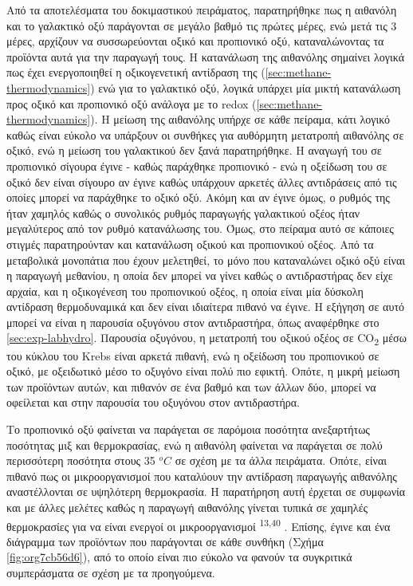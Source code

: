 \documentclass[11pt]{report}
\makeatletter
\newcommand{\citeprocitem}[2]{\hyper@linkstart{cite}{citeproc_bib_item_#1}#2\hyper@linkend}
\makeatother
\begin{document}
Από τα αποτελέσματα του δοκιμαστικού πειράματος, παρατηρήθηκε πως η αιθανόλη και το γαλακτικό οξύ παράγονται σε μεγάλο βαθμό τις πρώτες μέρες, ενώ μετά τις 3 μέρες, αρχίζουν να συσσωρεύονται οξικό και προπιονικό οξύ, καταναλώνοντας τα προϊόντα αυτά για την παραγωγή τους. Η κατανάλωση της αιθανόλης σημαίνει λογικά πως έχει ενεργοποιηθεί η οξικογενετική αντίδραση της (\autoref{sec:methane-thermodynamics}) ενώ για το γαλακτικό οξύ, λογικά υπάρχει μία μικτή κατανάλωση προς οξικό και προπιονικό οξύ ανάλογα με το \acrshort{redox} (\autoref{sec:methane-thermodynamics}). Η μείωση της αιθανόλης υπήρχε σε κάθε πείραμα, κάτι λογικό καθώς είναι εύκολο να υπάρξουν οι συνθήκες για αυθόρμητη μετατροπή αιθανόλης σε οξικό, ενώ η μείωση του γαλακτικού δεν ξανά παρατηρήθηκε. Η αναγωγή του σε προπιονικό σίγουρα έγινε - καθώς παράχθηκε προπιονικό - ενώ η οξείδωση του σε οξικό δεν είναι σίγουρο αν έγινε καθώς υπάρχουν αρκετές άλλες αντιδράσεις από τις οποίες μπορεί να παράχθηκε το οξικό οξύ. Ακόμη και αν έγινε όμως, ο ρυθμός της ήταν χαμηλός καθώς ο συνολικός ρυθμός παραγωγής γαλακτικού οξέος ήταν μεγαλύτερος από τον ρυθμό κατανάλωσης του. Όμως, στο πείραμα αυτό σε κάποιες στιγμές παρατηρούνταν και κατανάλωση οξικού και προπιονικού οξέος. Από τα μεταβολικά μονοπάτια που έχουν μελετηθεί, το μόνο που καταναλώνει οξικό οξύ είναι η παραγωγή μεθανίου, η οποία δεν μπορεί να γίνει καθώς ο αντιδραστήρας δεν είχε αρχαία, και η οξικογένεση του προπιονικού οξέος, η οποία είναι μία δύσκολη αντίδραση θερμοδυναμικά και δεν είναι ιδιαίτερα πιθανό να έγινε. Η εξήγηση σε αυτό μπορεί να είναι η παρουσία οξυγόνου στον αντιδραστήρα, όπως αναφέρθηκε στο \autoref{sec:exp-labhydro}. Παρουσία οξυγόνου, η μετατροπή του οξικού οξέος σε CO\textsubscript{2} μέσω του κύκλου του Krebs είναι αρκετά πιθανή, ενώ η οξείδωση του προπιονικού σε οξικό, με οξειδωτικό μέσο το οξυγόνο είναι πολύ πιο εφικτή. Οπότε, η μικρή μείωση των προϊόντων αυτών, και πιθανόν σε ένα βαθμό και των άλλων δύο, μπορεί να οφείλεται και στην παρουσία του οξυγόνου στον αντιδραστήρα.

Το προπιονικό οξύ φαίνεται να παράγεται σε παρόμοια ποσότητα ανεξαρτήτως ποσότητας μιξ και θερμοκρασίας, ενώ η αιθανόλη φαίνεται να παράγεται σε πολύ περισσότερη ποσότητα στους 35 \(^oC\) σε σχέση με τα άλλα πειράματα. Οπότε, είναι πιθανό πως οι μικροοργανισμοί που καταλύουν την αντίδραση παραγωγής αιθανόλης αναστέλλονται σε υψηλότερη θερμοκρασία. Η παρατήρηση αυτή έρχεται σε συμφωνία και με άλλες μελέτες καθώς η παραγωγή αιθανόλης γίνεται τυπικά σε χαμηλές θερμοκρασίες για να είναι ενεργοί οι μικροοργανισμοί \textsuperscript{\citeprocitem{13}{13},\citeprocitem{40}{40}} . Επίσης, έγινε και ένα διάγραμμα των προϊόντων που παράγονται σε κάθε συνθήκη (Σχήμα \ref{fig:org7cb56d6}), από το οποίο είναι πιο εύκολο να φανούν τα συγκριτικά συμπεράσματα σε σχέση με τα προηγούμενα.
\end{document}
